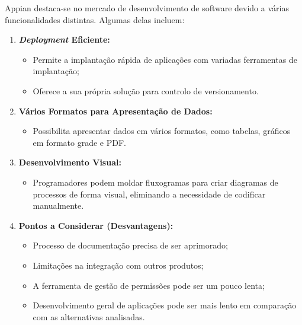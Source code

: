         Appian destaca-se no mercado de desenvolvimento de software devido a várias funcionalidades distintas. Algumas delas incluem:
        
        \begin{enumerate}
            \item \textbf{\textit{Deployment} Eficiente:}
                \begin{itemize}
                    \item Permite a implantação rápida de aplicações com variadas ferramentas de implantação;
                    \item Oferece a sua própria solução para controlo de versionamento.
                \end{itemize}
            
            \item \textbf{Vários Formatos para Apresentação de Dados:}
                \begin{itemize}
                    \item Possibilita apresentar dados em vários formatos, como tabelas, gráficos em formato grade e PDF.
                \end{itemize}
            
            \item \textbf{Desenvolvimento Visual:}
                \begin{itemize}
                    \item Programadores podem moldar fluxogramas para criar diagramas de processos de forma visual, eliminando a necessidade de codificar manualmente.
                \end{itemize}
            
            \item \textbf{Pontos a Considerar (Desvantagens):}
                \begin{itemize}
                    \item Processo de documentação precisa de ser aprimorado;
                    \item Limitações na integração com outros produtos;
                    \item A ferramenta de gestão de permissões pode ser um pouco lenta;
                    \item Desenvolvimento geral de aplicações pode ser mais lento em comparação com as alternativas analisadas.
                \end{itemize}
        \end{enumerate}
        
